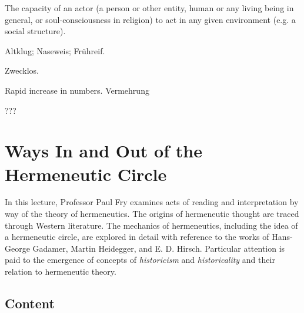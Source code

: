 \documentclass[]{scrartcl}
\begin{document}
\vspace{15pt}


\begin{description}[leftmargin=!,labelwidth=\widthof{\bfseries Proliferation}]
  \item[Agency] The capacity of an actor (a person or other entity, human or any living being in general, or soul-consciousness in religion) to act in any given environment (e.g. a social structure).
  \item[Precocious] Altklug; Naseweis; Fr\"uhreif.
  \item[Futile] Zwecklos.
  \item[Proliferation] Rapid increase in numbers. Vermehrung
  \item[Genealogy] ???
\end{description}


\section{Ways In and Out of the Hermeneutic Circle}


\vspace{15pt}

In this lecture, Professor Paul Fry examines acts of reading and interpretation by way of the theory of hermeneutics. The origins of hermeneutic thought are traced through Western literature. The mechanics of hermeneutics, including the idea of a hermeneutic circle, are explored in detail with reference to the works of Hans-George Gadamer, Martin Heidegger, and E. D. Hirsch. Particular attention is paid to the emergence of concepts of \emph{historicism} and \emph{historicality} and their relation to hermeneutic theory.


\subsection{Content}

\vspace{15pt}
\end{document}
